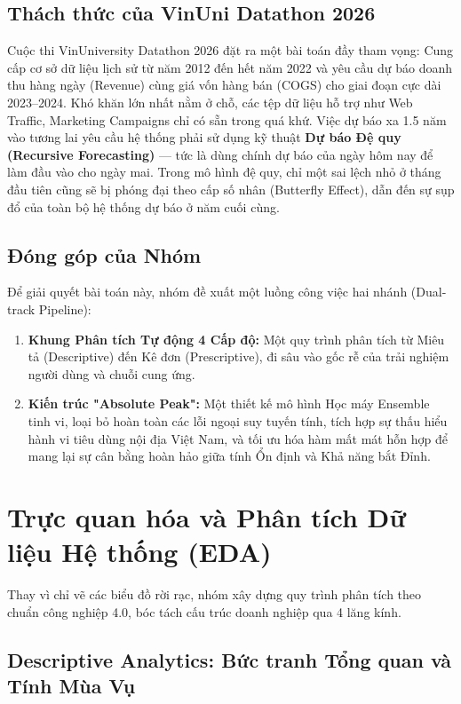 \documentclass{article}
\begin{document}
\subsection{Thách thức của VinUni Datathon 2026}
Cuộc thi VinUniversity Datathon 2026 đặt ra một bài toán đầy tham vọng: Cung cấp cơ sở dữ liệu lịch sử từ năm 2012 đến hết năm 2022 và yêu cầu dự báo doanh thu hàng ngày (Revenue) cùng giá vốn hàng bán (COGS) cho giai đoạn cực dài 2023--2024. Khó khăn lớn nhất nằm ở chỗ, các tệp dữ liệu hỗ trợ như Web Traffic, Marketing Campaigns chỉ có sẵn trong quá khứ. Việc dự báo xa 1.5 năm vào tương lai yêu cầu hệ thống phải sử dụng kỹ thuật \textbf{Dự báo Đệ quy (Recursive Forecasting)} — tức là dùng chính dự báo của ngày hôm nay để làm đầu vào cho ngày mai. Trong mô hình đệ quy, chỉ một sai lệch nhỏ ở tháng đầu tiên cũng sẽ bị phóng đại theo cấp số nhân (Butterfly Effect), dẫn đến sự sụp đổ của toàn bộ hệ thống dự báo ở năm cuối cùng.

\subsection{Đóng góp của Nhóm}
Để giải quyết bài toán này, nhóm đề xuất một luồng công việc hai nhánh (Dual-track Pipeline):
\begin{enumerate}
    \item \textbf{Khung Phân tích Tự động 4 Cấp độ:} Một quy trình phân tích từ Miêu tả (Descriptive) đến Kê đơn (Prescriptive), đi sâu vào gốc rễ của trải nghiệm người dùng và chuỗi cung ứng.
    \item \textbf{Kiến trúc "Absolute Peak":} Một thiết kế mô hình Học máy Ensemble tinh vi, loại bỏ hoàn toàn các lỗi ngoại suy tuyến tính, tích hợp sự thấu hiểu hành vi tiêu dùng nội địa Việt Nam, và tối ưu hóa hàm mất mát hỗn hợp để mang lại sự cân bằng hoàn hảo giữa tính Ổn định và Khả năng bắt Đỉnh.
\end{enumerate}

\section{Trực quan hóa và Phân tích Dữ liệu Hệ thống (EDA)}

Thay vì chỉ vẽ các biểu đồ rời rạc, nhóm xây dựng quy trình phân tích theo chuẩn công nghiệp 4.0, bóc tách cấu trúc doanh nghiệp qua 4 lăng kính.

\subsection{Descriptive Analytics: Bức tranh Tổng quan và Tính Mùa Vụ}
\end{document}
